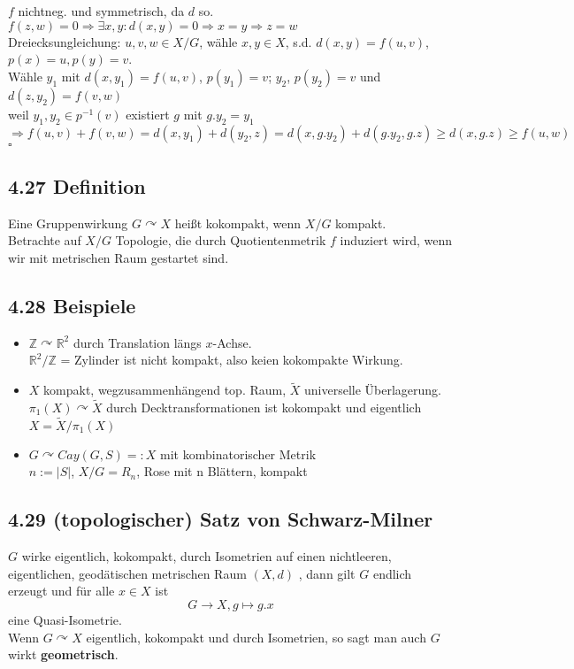 \documentclass{article}
\newcommand{\df}[1]{\textbf{#1}\index{#1}}
\newcommand{\Z}{\mathbb{Z}}
\newcommand{\R}{\mathbb{R}}
\newcommand{\qed}{$\square$}
\begin{document}
$f$ nichtneg. und symmetrisch, da $d$ so.\\
$f(z,w) = 0 \Longrightarrow \exists x,y: d(x,y) = 0 \Longrightarrow x = y \Longrightarrow z = w$\\
Dreiecksungleichung: $u,v,w \in X/G$, wähle $x, y \in X$, s.d. $d(x,y) = f(u,v)$, $p(x) = u, p(y) = v$.\\
Wähle $y_1$ mit $d(x,y_1) = f(u,v)$, $p(y_1) = v$; $y_2$, $p(y_2) = v$ und $d(z,y_2) = f(v,w)$\\
weil $y_1, y_2 \in p^{-1}(v)$ existiert $g$ mit $g.y_2 =y_1$\\
$\Longrightarrow f(u,v) + f(v,w) = d(x,y_1)+d(y_2,z) = d(x,g.y_2) + d(g.y_2, g.z) \geq d(x,g.z) \geq f(u,w)$
\qed


\subsection{4.27 Definition}
Eine Gruppenwirkung $G\curvearrowright X$ heißt kokompakt, wenn $X/G$ kompakt.\\
Betrachte auf $X/G$ Topologie, die durch Quotientenmetrik $f$ induziert wird, wenn wir mit metrischen Raum gestartet sind.

\subsection{4.28 Beispiele}
\begin{itemize}
	\item $\Z \curvearrowright \R^2$ durch Translation längs $x$-Achse.\\
	$\R^2/\Z$ = Zylinder ist nicht kompakt, also keien kokompakte Wirkung.
	
	\item $X$ kompakt, wegzusammenhängend top. Raum, $\widetilde{X}$ universelle Überlagerung.\\
	$\pi_1(X) \curvearrowright \widetilde{X}$ durch Decktransformationen ist kokompakt und eigentlich\\
	$X = \widetilde{X}/ \pi_1(X)$
	
	\item $G \curvearrowright Cay(G,S) =: X$ mit kombinatorischer Metrik\\
	$n := |S|$, $X/G = R_n$, Rose mit n Blättern, kompakt
\end{itemize}

\subsection{4.29 (topologischer) Satz von Schwarz-Milner}
$G$ wirke eigentlich, kokompakt, durch Isometrien auf einen nichtleeren, eigentlichen, geodätischen metrischen Raum $(X,d)$
, dann gilt $G$ endlich erzeugt und für alle $x \in X$ ist
\[G \longrightarrow X, g \longmapsto g.x\]
eine Quasi-Isometrie.\\
Wenn $G\curvearrowright X$ eigentlich, kokompakt und durch Isometrien, so sagt man auch $G$ wirkt \df{geometrisch}.
\end{document}
